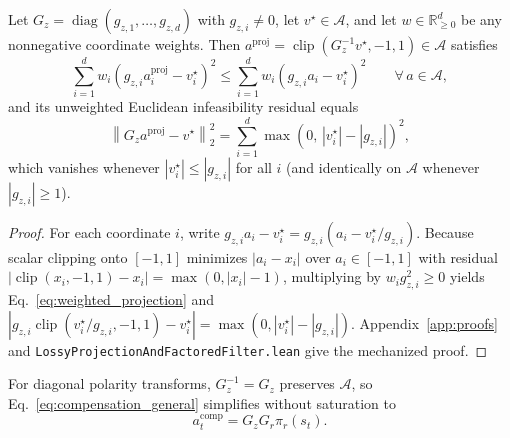 \documentclass[twoside,11pt]{article}
\newcommand{\gain}{G}
\newcommand{\clip}{\operatorname{clip}}
\begin{document}
\begin{proposition}
\label{prop:box_projection}
Let $\gain_z=\operatorname{diag}(g_{z,1},\ldots,g_{z,d})$ with $g_{z,i}\ne 0$, let $v^\star\in\mathcal{A}$, and let $w\in\mathbb{R}_{\ge 0}^d$ be any nonnegative coordinate weights. Then $a^{\mathrm{proj}}=\clip(\gain_z^{-1}v^\star,-1,1)\in\mathcal{A}$ satisfies
\begin{equation}
    \sum_{i=1}^d w_i\left(g_{z,i}a_i^{\mathrm{proj}}-v_i^\star\right)^2
    \le \sum_{i=1}^d w_i\left(g_{z,i}a_i-v_i^\star\right)^2
    \qquad \forall\,a\in\mathcal{A},
    \label{eq:weighted_projection}
\end{equation}
and its unweighted Euclidean infeasibility residual equals
\begin{equation}
    \left\|\gain_z a^{\mathrm{proj}}-v^\star\right\|_2^2
    = \sum_{i=1}^d \max\!\left(0,\,|v_i^\star|-|g_{z,i}|\right)^2,
    \label{eq:infeasibility_residual}
\end{equation}
which vanishes whenever $|v_i^\star|\le |g_{z,i}|$ for all $i$ (and identically on $\mathcal{A}$ whenever $|g_{z,i}|\ge 1$).
\end{proposition}
\begin{proof}
For each coordinate $i$, write $g_{z,i}a_i-v_i^\star=g_{z,i}(a_i-v_i^\star/g_{z,i})$. Because scalar clipping onto $[-1,1]$ minimizes $|a_i-x_i|$ over $a_i\in[-1,1]$ with residual $|{\clip(x_i,-1,1)-x_i}|=\max(0,|x_i|-1)$, multiplying by $w_i g_{z,i}^2\ge 0$ yields Eq.~\eqref{eq:weighted_projection} and $|g_{z,i}\clip(v_i^\star/g_{z,i},-1,1)-v_i^\star|=\max(0,|v_i^\star|-|g_{z,i}|)$. Appendix~\ref{app:proofs} and \texttt{LossyProjectionAndFactoredFilter.lean} give the mechanized proof.
\end{proof}

For diagonal polarity transforms, $\gain_z^{-1}=\gain_z$ preserves $\mathcal{A}$, so Eq.~\eqref{eq:compensation_general} simplifies without saturation to
\begin{equation}
    a_t^{\mathrm{comp}}
    = \gain_z\gain_r\pi_r(s_t).
    \label{eq:compensation_polarity}
\end{equation}
\end{document}

